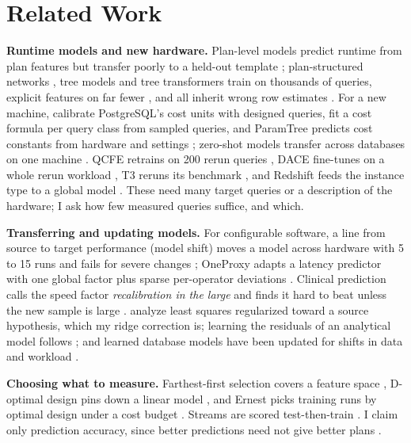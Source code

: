\documentclass{article}
\begin{document}
\section{Related Work}
\textbf{Runtime models and new hardware.} Plan-level models predict runtime from plan features \parencite{ganapathi2009} but transfer poorly to a held-out template \parencite{akdere2012}; plan-structured networks \parencite{marcus2019}, tree models \parencite{sun2020} and tree transformers \parencite{zhao2022} train on thousands of queries, explicit features on far fewer \parencite{yu2023}, and all inherit wrong row estimates \parencite{leis2015}. For a new machine, \textcite{wu2013} calibrate PostgreSQL's cost units with designed queries, \textcite{zhu1994} fit a cost formula per query class from sampled queries, and ParamTree predicts cost constants from hardware and settings \parencite{yang2023}; zero-shot models transfer across databases on one machine \parencite{hilprecht2022}. QCFE retrains on 200 rerun queries \parencite{yan2024qcfe}, DACE fine-tunes on a whole rerun workload \parencite{liang2024dace}, T3 reruns its benchmark \parencite{rieger2025t3}, and Redshift feeds the instance type to a global model \parencite{wu2024stage}. These need many target queries or a description of the hardware; I ask how few measured queries suffice, and which.

\textbf{Transferring and updating models.} For configurable software, a line from source to target performance (model shift) moves a model across hardware with 5 to 15 runs \parencite{valov2017,jamshidi2017} and fails for severe changes \parencite{valov2020,jamshidi2018}; OneProxy adapts a latency predictor with one global factor plus sparse per-operator deviations \parencite{lu2021oneproxy}. Clinical prediction calls the speed factor \emph{recalibration in the large} and finds it hard to beat unless the new sample is large \parencite{steyerberg2004,vergouwe2017}. \textcite{kuzborskij2013} analyze least squares regularized toward a source hypothesis, which my ridge correction is; learning the residuals of an analytical model follows \textcite{didona2015}; and learned database models have been updated for shifts in data and workload \parencite{kurmanji2023,wui2024}.

\textbf{Choosing what to measure.} Farthest-first selection covers a feature space \parencite{gonzalez1985,sener2018}, D-optimal design pins down a linear model \parencite{wynn1970,mitchell1974}, and Ernest picks training runs by optimal design under a cost budget \parencite{venkataraman2016ernest}. Streams are scored test-then-train \parencite{gama2013}. I claim only prediction accuracy, since better predictions need not give better plans \parencite{heinrich2025}.
\end{document}
